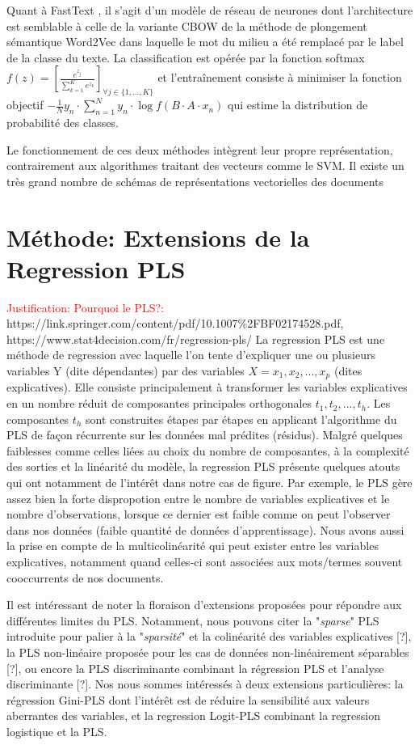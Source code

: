   Quant à FastText \citep{grave2017fasttextcls}, il s'agit d'un modèle de réseau de neurones dont l'architecture est semblable à celle de la variante CBOW de la méthode de plongement sémantique Word2Vec dans laquelle le mot du milieu a été remplacé par le label de la classe du texte. La classification est opérée par la fonction softmax $f(z) = \left[ \frac{e^{z_j}}{\sum\limits_{k=1}^K e^{z_k}} \right]_{\forall j \in \lbrace 1, ..., K \rbrace} $ et l'entraînement consiste à minimiser la fonction objectif $-\frac{1}{N}y_n \cdot \sum\limits_{n=1}^N y_n \cdot \log{f(B\cdot A\cdot x_n)}$ qui estime la distribution de probabilité des classes.

Le fonctionnement de ces deux méthodes intègrent leur propre représentation, contrairement aux algorithmes traitant des vecteurs comme le SVM. Il existe un très grand nombre de schémas de représentations vectorielles des documents


\section{Méthode: Extensions de la Regression PLS}
\label{sec:sensresultat:pls}
\textcolor{red}{Justification: Pourquoi le PLS?:}
https://link.springer.com/content/pdf/10.1007\%2FBF02174528.pdf, 
https://www.stat4decision.com/fr/regression-pls/
La regression PLS est une méthode de regression avec laquelle l'on tente d'expliquer une ou plusieurs variables Y (dite dépendantes) par des variables $X=x_1,x_2,...,x_p$ (dites explicatives). Elle consiste principalement à transformer les variables explicatives en un nombre réduit de composantes principales orthogonales $t_1, t_2, ..., t_h$. Les composantes $t_h$ sont construites étapes par étapes en applicant l'algorithme du PLS de façon récurrente sur les données mal prédites (résidus). Malgré quelques faiblesses comme celles liées au choix du nombre de composantes, à la complexité des sorties et la linéarité du modèle, la regression PLS présente quelques atouts qui ont notamment de l'intérêt dans notre cas de figure. Par exemple, le PLS gère assez bien la forte dispropotion entre le nombre de variables explicatives et le nombre d'observations, lorsque ce dernier est faible comme on peut l'observer dans nos données (faible quantité de données d'apprentissage). Nous avons aussi la prise en compte de la multicolinéarité qui peut exister entre les variables explicatives, notamment quand celles-ci sont associées aux mots/termes souvent cooccurrents de nos documents.

Il est intéressant de noter la floraison d'extensions proposées pour répondre aux différentes limites du PLS. Notamment, nous pouvons citer la "\textit{sparse}" PLS introduite pour palier à la "\textit{sparsité}" et la colinéarité des variables explicatives [?], la PLS non-linéaire proposée pour les cas de données non-linéairement séparables [?], ou encore la PLS discriminante combinant la régression PLS et l'analyse discriminante [?]. Nos nous sommes intéressés à deux extensions particulières: la régression Gini-PLS \citep{souissi2013ginipls} dont l'intérêt est de réduire la sensibilité aux valeurs aberrantes des variables, et la regression Logit-PLS \citep{tenenhaus2005logitpls}  combinant la regression logistique et la PLS.
